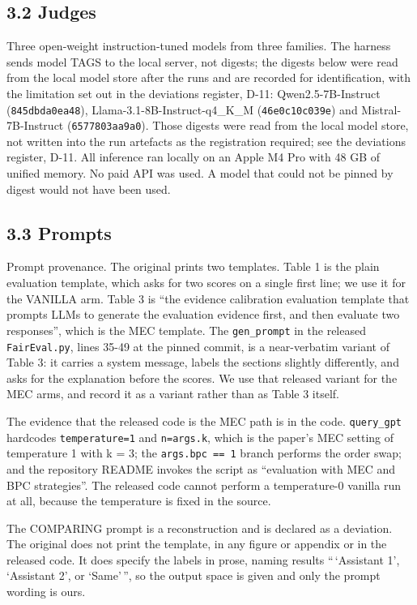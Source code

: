 \subsection{3.2 Judges}\label{judges}

Three open-weight instruction-tuned models from three families. The harness sends model TAGS to
the local server, not digests; the digests below were read from the local model store after the runs
and are recorded for identification, with the limitation set out in the deviations register, D-11:
Qwen2.5-7B-Instruct (\texttt{845dbda0ea48}), Llama-3.1-8B-Instruct-q4\_K\_M (\texttt{46e0c10c039e}) and
Mistral-7B-Instruct (\texttt{6577803aa9a0}). Those digests were read from the local model store, not
written into the run artefacts as the registration required; see the deviations register, D-11. All inference
ran locally on an Apple M4 Pro with 48 GB of
unified memory. No paid API was used. A model that could not be pinned by digest would not have been
used.

\subsection{3.3 Prompts}\label{prompts}

Prompt provenance. The original prints two templates. Table 1 is the plain evaluation template,
which asks for two scores on a single first line; we use it for the VANILLA arm. Table 3 is ``the
evidence calibration evaluation template that prompts LLMs to generate the evaluation evidence
first, and then evaluate two responses'', which is the MEC template. The \texttt{gen\_prompt} in the released
\texttt{FairEval.py}, lines 35-49 at the pinned commit, is a near-verbatim variant of Table 3: it carries a
system message, labels the sections slightly differently, and asks for the explanation before the
scores. We use that released variant for the MEC arms, and record it as a variant rather than as
Table 3 itself.

The evidence that the released code is the MEC path is in the code. \texttt{query\_gpt} hardcodes
\texttt{temperature=1} and \texttt{n=args.k}, which is the paper's MEC setting of temperature 1 with k = 3; the
\texttt{args.bpc\ ==\ 1} branch performs the order swap; and the repository README invokes the script as
``evaluation with MEC and BPC strategies''. The released code cannot perform a temperature-0 vanilla
run at all, because the temperature is fixed in the source.

The COMPARING prompt is a reconstruction and is declared as a deviation. The original does not print
the template, in any figure or appendix or in the released code. It does specify the labels in prose,
naming results ``\,`Assistant 1', `Assistant 2', or `Same'\,'', so the output space is given and only the
prompt wording is ours.

